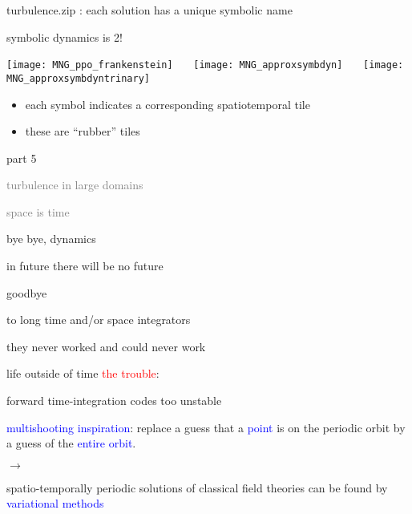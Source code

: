 \begin{frame}{turbulence.zip : each solution has a unique symbolic name}
  \begin{block} {symbolic dynamics is 2\dmn!}
  \begin{center}
  \texttt{[image: MNG\_ppo\_frankenstein]}
~~~\texttt{[image: MNG\_approxsymbdyn]}
~~~\texttt{[image: MNG\_approxsymbdyntrinary]}
  \end{center}
  \end{block}
\begin{itemize}
 \item each symbol indicates a corresponding spatiotemporal tile
 \item these are ``rubber'' tiles
\end{itemize}
\end{frame}

\begin{frame}{part 5}
\begin{enumerate}
              \item
    \textcolor{gray}{\small
turbulence in large domains
              \item
space is time
    }
              \item
    {\Large
bye bye, dynamics
    }
            \end{enumerate}
\end{frame}

\begin{frame}{in future there will be no future}
\begin{center}
{\huge goodbye}
\end{center}

\vfill

to long time and/or space integrators

\medskip

\hfill they never worked and could never work
\end{frame}

\begin{frame}{life outside of time}
\textcolor{red}{the trouble}:

forward time-integration codes too unstable

\bigskip
\bigskip

\textcolor{blue}{multishooting inspiration}:
 replace a guess that a  \textcolor{blue}{point} is on the periodic
orbit by a guess of the \textcolor{blue}{entire orbit}.

\bigskip

$\to$

\bigskip

spatio-temporally periodic solutions of classical field theories
can be found by \textcolor{blue}{variational methods}
\end{frame}

